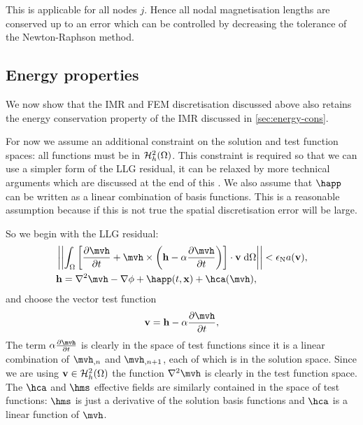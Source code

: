 This is applicable for all nodes $j$.
Hence all nodal magnetisation lengths are conserved up to an error which can be controlled by decreasing the tolerance of the Newton-Raphson method.


\subsection{Energy properties}

\newcommand{\midpoint}[1]{\hat{#1}}
\newsubcommand{\mvm}{\midpoint{\mv}}{n}
\newcommand{\tm}{\midpoint{t}_n}
\newcommand{\dtop}{\delta}
\newcommand{\pdsub}[3]{\mathrlap{\pd{#1\mathrlap{_{#2}}}{#3}}\phantom{\pd{#1_{#2}}{#3}}}
\newcommand{\dmdtm}{\dtop \mv}
\newcommand{\dmdtml}{\dtop \mv_{n,l}}
\newcommand{\dmdtmj}{\dtop \mv_{n,j}}

\newcommand{\ipg}[2]{\intd{{#1} \cdot {#2}}}

We now show that the IMR and FEM discretisation discussed above also retains the energy conservation property of the IMR discussed in \cref{sec:energy-cons}.

For now we assume an additional constraint on the solution and test function spaces: all functions must be in $\mathcal{H}_h^2(\Omega)$.
This constraint is required so that we can use a simpler form of the LLG residual, it can be relaxed by more technical arguments which are discussed at the end of this .
We also assume that $\happ$ can be written as a linear combination of basis functions.
This is a reasonable assumption because if this is not true the spatial discretisation error will be large.

So we begin with the LLG residual:
\begin{equation}
  \begin{aligned}
    &\norm{\intd{ \bigs{\dmdth + \mvh \times \bigb{\hv - \dampc \dmdth}} \cdot \testv}} < \ntol \sumbasiscoeff(\testv), \\
      &\hv = \lap \mvh - \nabla \phim + \happ(t, \xv) + \hca(\mvh),
    \end{aligned}
  \label{eq:85}
\end{equation}
and choose the vector test function
\begin{equation}
  \testv = \hv - \dampc \dmdth,
  \label{eq:84}
\end{equation}
The term $\dampc \dmdth$ is clearly in the space of test functions since it is a linear combination of $\mvh_{,n}$ and $\mvh_{,n+1}$, each of which is in the solution space.
Since we are using $\boldsymbol{\mathrm{v}} \in \mathcal{H}_h^2(\Omega)$ the function $\lap \mvh$ is clearly in the test function space.
The $\hca$ and $\hms$ effective fields are similarly contained in the space of test functions: $\hms$ is just a derivative of the solution basis functions and $\hca$ is a linear function of $\mvh$.

